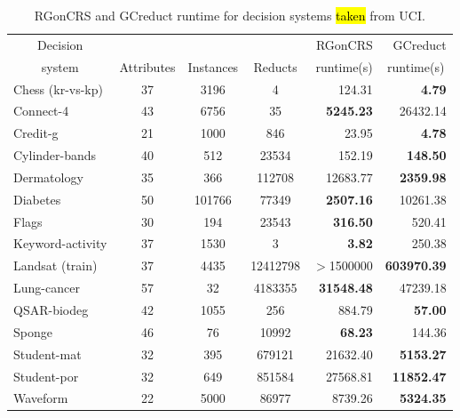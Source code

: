 \documentclass[number,preprint,review,12pt]{elsarticle}
\begin{document}
	\begin{table}[!htb]
		\caption{RGonCRS and GCreduct runtime for decision systems \hl{taken} from UCI.}\label{tab:matlab}
		\centering \footnotesize
		\begin{tabular}{|l|c|c|c|r|r|}
			\hline
			\multicolumn{1}{|c|}{Decision}&&&& RGonCRS & GCreduct\\ 
			\multicolumn{1}{|c|}{system} & Attributes & Instances & Reducts & runtime(s) & \multicolumn{1}{c|}{runtime(s)}\\ 
			\hline
			Chess (kr-vs-kp)          & 37         & 3196      & 4        & 124.31            & \textbf{4.79}      \\
			Connect-4                 & 43         & 6756      & 35       & \textbf{5245.23}  & 26432.14           \\
			Credit-g                  & 21         & 1000      & 846      & 23.95             & \textbf{4.78}      \\
			Cylinder-bands            & 40         & 512       & 23534    & 152.19            & \textbf{148.50}    \\
			Dermatology               & 35         & 366       & 112708   & 12683.77          & \textbf{2359.98}   \\
			Diabetes                  & 50         & 101766    & 77349    & \textbf{2507.16}  & 10261.38           \\
			Flags                     & 30         & 194       & 23543    & \textbf{316.50}   & 520.41             \\
			Keyword-activity          & 37         & 1530      & 3        & \textbf{3.82}     & 250.38             \\
			Landsat (train)           & 37         & 4435      & 12412798 & $>$1500000        & \textbf{603970.39} \\
			Lung-cancer               & 57         & 32        & 4183355  & \textbf{31548.48} & 47239.18           \\
			QSAR-biodeg               & 42         & 1055      & 256      &  884.79           & \textbf{57.00}     \\
			Sponge                    & 46         & 76        & 10992    & \textbf{68.23}    & 144.36             \\
			Student-mat               & 32         & 395       & 679121   & 21632.40          & \textbf{5153.27}   \\
			Student-por               & 32         & 649       & 851584   & 27568.81          & \textbf{11852.47}  \\
			Waveform                  & 22         & 5000      & 86977    & 8739.26           & \textbf{5324.35}   \\				
			\hline
    	\end{tabular}
    \end{table}
    	
\end{document}
